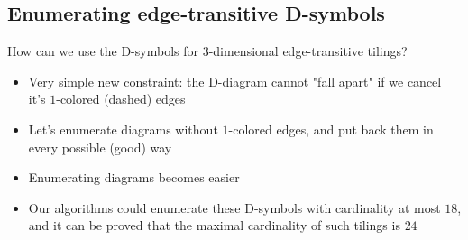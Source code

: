\subsection{Enumerating edge-transitive D-symbols}
\begin{frame}
  How can we use the D-symbols for $3$-dimensional edge-transitive tilings?
  \begin{itemize}
    \item Very simple new constraint: the D-diagram cannot "fall apart" if we
      cancel it's $1$-colored (dashed) edges
    \item Let's enumerate diagrams without $1$-colored edges, and put back them
      in every possible (good) way
    \item Enumerating diagrams becomes easier
    \item Our algorithms could enumerate these D-symbols with cardinality at
      most $18$, and it can be proved that the maximal cardinality of such
      tilings is $24$
  \end{itemize}
\end{frame}

\begin{frame}
  \nocite{DHM93,D87,Du88,H93,LM90,Ma67,M94,T82,VS93,F94,F03}
  
  
\end{frame}


